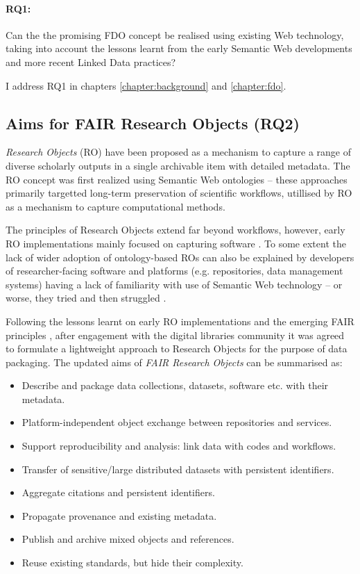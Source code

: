 \paragraph{RQ1:}\label{rq1} 
Can the the promising FDO concept be realised using existing Web technology, taking into account the lessons learnt from the early Semantic Web developments and more recent Linked Data practices?

I address RQ1 in chapters \ref{chapter:background} and \ref{chapter:fdo}.


\subsection{Aims for FAIR Research Objects (RQ2)}
\label{intro:rq2}

\emph{Research Objects} (RO) \cite{Bechhofer 2013} have been proposed as a mechanism to capture a range of diverse scholarly outputs in a single archivable item with detailed metadata. The RO concept was first realized using Semantic Web ontologies \cite{ch5-92,Belhajjame 2015} -- these approaches primarily targetted long-term preservation of scientific workflows, utillised by RO as a mechanism to capture computational methods.

The principles of Research Objects extend far beyond workflows, however, early RO implementations mainly focused on capturing software \cite{goble-ro2018}. To some extent the lack of wider adoption of ontology-based ROs can also be explained by developers of researcher-facing software and platforms (e.g. repositories, data management systems) having a lack of familiarity with use of Semantic Web technology -- or worse, they tried and then struggled \cite{carrieroLandscapeOntologyReuse2020a,Tudorache 2020}.

Following the lessons learnt on early RO implementations and the emerging FAIR principles \cite{Wilkinson 2016,Jacobsen 2020}, after engagement with the digital libraries community it was agreed to formulate a lightweight approach to Research Objects \cite{Sefton 2018,10.5281/zenodo.3337883} for the purpose of data packaging. The updated aims of \emph{FAIR Research Objects} can be summarised as:
 
\begin{itemize}
    \item Describe and package data collections, datasets, software etc. with their metadata.
    \item Platform-independent object exchange between repositories and services.
    \item Support reproducibility and analysis: link data with codes and workflows.
    \item Transfer of sensitive/large distributed datasets with persistent identifiers.
    \item Aggregate citations and persistent identifiers.
    \item Propagate provenance and existing metadata.
    \item Publish and archive mixed objects and references.
    \item Reuse existing standards, but hide their complexity.
\end{itemize}


